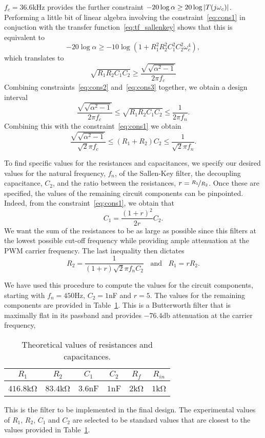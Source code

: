 $f_c = 36.6$\unit{\kilo\hertz} provides the further constraint $-20 \log \alpha
\geq 20 \log{ \left|{T(j\omega_c)}\right|}$. Performing a little bit of linear algebra
involving the constraint~\eqref{eq:cons1} in conjuction with the transfer
function~\eqref{eq:tf_sallenkey} shows that this is equivalent to
\[ -20 \log \alpha \geq -10 \log{\left(1+R_1^2R_2^2C_1^2C_2^2\omega_c^4\right)},
\] which translates to  
%
\begin{equation}
    \sqrt{R_1R_2C_1C_2} \geq \frac{\sqrt{\sqrt{\alpha^2-1}}}{2\pi f_c}
    \label{eq:cons3}
\end{equation}
%
Combining constraints~\eqref{eq:cons2} and~\eqref{eq:cons3} together, we obtain
a design interval \[ \frac{\sqrt{\sqrt{\alpha^2 - 1}}}{2\pi f_c} \leq
\sqrt{R_1R_2C_1C_2} \leq \frac{1}{2\pi f_n}. \] Combining
this with the constraint~\eqref{eq:cons1} we obtain \[
\frac{\sqrt{\sqrt{\alpha^2 - 1}}}{\sqrt{2}\pi f_c} \leq (R_1+R_2)C_2 \leq
\frac{1}{\sqrt{2}\pi f_n}. \]

To find specific values for the resistances and capacitances, we specify our
desired values for the natural frequency, $f_n$, of the Sallen-Key filter, the
decoupling capacitance, $C_2$, and the ratio between the resistances, $r =
\nicefrac{R_1}{R_2}$. Once these are specified, the values of the remaining
circuit components can be pinpointed. Indeed, from the
constraint~\eqref{eq:cons1}, we obtain that \[C_1 = \frac{(1+r)^2}{2r}C_2. \] We
want the sum of the resistances to be as large as possible since this filters at
the lowest possible cut-off frequency while providing ample attenuation at the
PWM carrier frequency. The last inequality then dictates \[ R_2 =
\frac{1}{(1+r)\sqrt2\pi f_n C_2} \;\; \text{ and } \;\; R_1 = rR_2.\]

We have used this procedure to compute the values for the circuit components,
starting with $f_n = 450$\unit{\hertz}, $C_2 = 1$\unit{\nano\farad} and $r = 5$.
The values for the remaining components are provided in
Table~\ref{tab:theoretical_values}. This is a Butterworth filter that is
maximally flat in its passband and provides $-76.4$\unit{\decibel} attenuation
at the carrier frequency, 

{\renewcommand{\arraystretch}{1.5}
\begin{table}[t]
    \centering
    \caption{Theoretical values of resistances and capacitances.}
    \begin{tabular}{*6c}
        \toprule
        $R_1$ & $R_2$ & $C_1$ & $C_2$ & $R_f$ & $R_{in}$ \\    
        \hline
        \midrule
        $416.8$\unit{\kilo\ohm} & $83.4$\unit{\kilo\ohm} &
        $3.6$\unit{\nano\farad} & $1$\unit{\nano\farad} &
        $2$\unit{\kilo\ohm} & $1$\unit{\kilo\ohm} \\
        \bottomrule
    \end{tabular}
    \label{tab:theoretical_values}
    \vspace{-1em}
\end{table}
}

\begin{rem}
    This is the filter to be implemented in the final design. The experimental
    values of $R_{1}$, $R_2$, $C_{1}$ and $C_2$ are selected to be standard
    values that are closest to the values provided in
    Table~\ref{tab:theoretical_values}.
\end{rem}
